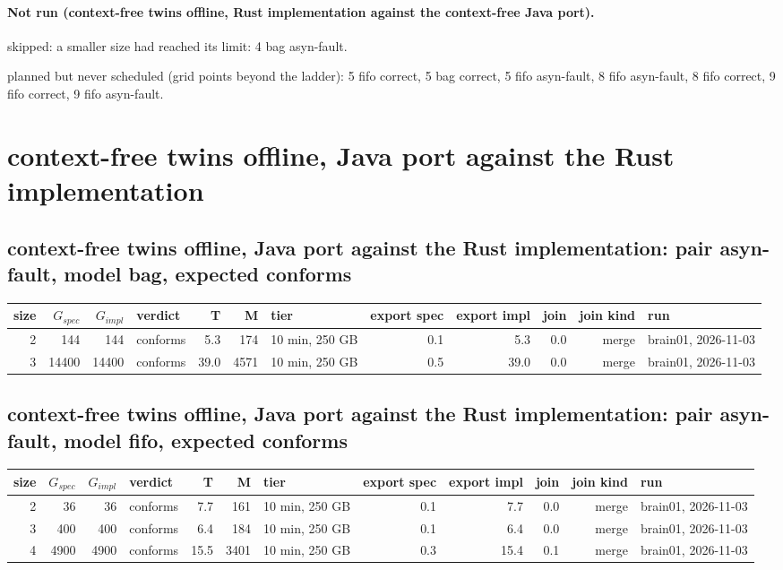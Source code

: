 \documentclass[10pt]{article}
\begin{document}
\paragraph{Not run (context-free twins offline, Rust implementation against the context-free Java port).}
skipped: a smaller size had reached its limit: 4 bag asyn-fault.\par
planned but never scheduled (grid points beyond the ladder): 5 fifo correct, 5 bag correct, 5 fifo asyn-fault, 8 fifo asyn-fault, 8 fifo correct, 9 fifo correct, 9 fifo asyn-fault.\par
\section*{context-free twins offline, Java port against the Rust implementation}
\subsection*{context-free twins offline, Java port against the Rust implementation: pair \textsf{asyn-fault}, model bag, expected conforms}
\begin{longtable}{@{}rrrlrrlrrrrl@{}}
\toprule
size & $G_{\mathit{spec}}$ & $G_{\mathit{impl}}$ & verdict & T & M & tier & export spec & export impl & join & join kind & run \\
\midrule
\endhead
\color{blue} 2 & 144 & 144 & conforms & 5.3 & 174 & 10 min, 250 GB & 0.1 & 5.3 & 0.0 & merge & brain01, 2026-11-03 \\
\color{blue} 3 & 14400 & 14400 & conforms & 39.0 & 4571 & 10 min, 250 GB & 0.5 & 39.0 & 0.0 & merge & brain01, 2026-11-03 \\
\bottomrule
\end{longtable}
\subsection*{context-free twins offline, Java port against the Rust implementation: pair \textsf{asyn-fault}, model fifo, expected conforms}
\begin{longtable}{@{}rrrlrrlrrrrl@{}}
\toprule
size & $G_{\mathit{spec}}$ & $G_{\mathit{impl}}$ & verdict & T & M & tier & export spec & export impl & join & join kind & run \\
\midrule
\endhead
\color{blue} 2 & 36 & 36 & conforms & 7.7 & 161 & 10 min, 250 GB & 0.1 & 7.7 & 0.0 & merge & brain01, 2026-11-03 \\
\color{blue} 3 & 400 & 400 & conforms & 6.4 & 184 & 10 min, 250 GB & 0.1 & 6.4 & 0.0 & merge & brain01, 2026-11-03 \\
\color{blue} 4 & 4900 & 4900 & conforms & 15.5 & 3401 & 10 min, 250 GB & 0.3 & 15.4 & 0.1 & merge & brain01, 2026-11-03 \\
\bottomrule
\end{longtable}
\end{document}
